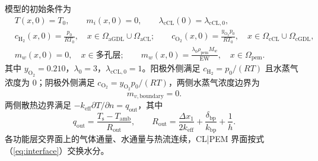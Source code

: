 \documentclass{gmcmthesis}
\begin{document}
模型的初始条件为
\begin{equation}
  \begin{aligned}
    &T(x,0)=T_0,\qquad
    m_i(x,0)=0,\qquad
    \lambda_{\mathrm{cCL}}(0)=\lambda_{\mathrm{cCL},0},\\
    &c_{\mathrm{H_2}}(x,0)=\frac{p_0}{RT_0},\quad x\in\Omega_{\mathrm{aGDL}}\cup\Omega_{\mathrm{aCL}};\qquad
    c_{\mathrm{O_2}}(x,0)=\frac{y_{\mathrm{O_2}}p_0}{RT_0},\quad x\in\Omega_{\mathrm{cCL}}\cup\Omega_{\mathrm{cGDL}},\\
    &m_w(x,0)=0,\quad x\in\text{多孔层};\qquad
    m_w(x,0)=\frac{\lambda_0\rho_{\mathrm{pem}}M_w}{\mathrm{EW}},\quad x\in\Omega_{\mathrm{pem}}.
  \end{aligned}
  \label{eq:init}
\end{equation}
其中 $y_{\mathrm{O_2}}=0.210$，$\lambda_0=3$，$\lambda_{\mathrm{cCL},0}=1$。阳极外侧满足 $c_{\mathrm{H_2}}=p_0/(RT)$ 且水蒸气浓度为 $0$；阴极外侧满足 $c_{\mathrm{O_2}}=y_{\mathrm{O_2}}p_0/(RT)$，两侧水蒸气浓度边界为
\begin{equation}
  m_{v,\mathrm{boundary}}=0.
  \label{eq:vapbc}
\end{equation}
两侧散热边界满足 $-k_{\mathrm{eff}}\partial T/\partial n=q_{\mathrm{out}}$，其中
\begin{equation}
  q_{\mathrm{out}}=\frac{T_{\mathrm{s}}-T_{\mathrm{amb}}}{R_{\mathrm{out}}},
  \qquad
  R_{\mathrm{out}}=\frac{\Delta x_1}{2k_{\mathrm{eff}}}+\frac{\delta_{\mathrm{bp}}}{k_{\mathrm{bp}}}+\frac{1}{h}.
  \label{eq:heatbc}
\end{equation}
各功能层交界面上的气体通量、水通量与热流连续，CL|PEM 界面按式（\ref{eq:interface}）交换水分。
\end{document}
